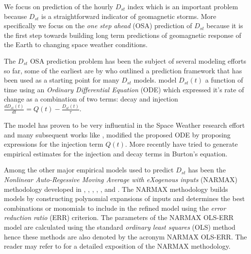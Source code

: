 \documentclass[referee,a4paper,12pt,traditabstract]{swsc}
\begin{document}
\begin{linenumbers}

We focus on prediction of the hourly $D_{st}$ index which is an important problem because $D_{st}$ is a straightforward indicator of geomagnetic storms. More specifically we focus on the \emph{one step ahead} (OSA) prediction of $D_{st}$ because it is the first step towards building long term predictions of geomagnetic response of the Earth to changing space weather conditions. 

The $D_{st}$ OSA prediction problem has been the subject of several modeling efforts so far, some of the earliest are by \citet{JGR:JGR10260} who outlined a prediction framework that has been used as a starting point for many $D_{st}$ models. \citet{JGR:JGR10260} model $D_{st}(t)$ a function of time using an \emph{Ordinary Differential Equation} (ODE) which expressed it's rate of change as a combination of two terms: decay and injection $\frac{d D_{st}(t)}{dt} = Q(t) - \frac{D_{st}(t)}{\tau}$. 

The \citet{JGR:JGR10260} model has proven to be very influential in the Space Weather research effort and many subsequent works like \citet{Wang:Dst}, \citet{JGRA:JGRA14856} modified the proposed ODE by proposing expressions for the injection term $Q(t)$. More recently \citet{Ballatore2014} have tried to generate empirical estimates for the injection and decay terms in Burton's equation.

Among the other major empirical models used to predict $D_{st}$ has been the \emph{Nonlinear Auto-Regessive Moving Average with eXogenous inputs} (NARMAX) methodology developed in \citet{doi:10.1080/00207178908559767}, \citet{GRL:GRL13494}, \citet{GRL:GRL20944}, \citet{JGRA:JGRA18657}, \citet{balikhin:narmax}, \citet{JGRA:JGRA20661} and \citet{JGRA:JGRA50192}. The NARMAX methodology builds models by constructing polynomial expansions of inputs and determines the best combinations or monomials to include in the refined model using the \emph{error reduction ratio} (ERR) criterion. The parameters of the NARMAX OLS-ERR model are calculated using the standard \emph{ordinary least squares} (OLS) method hence these methods are also denoted by the acronym NARMAX OLS-ERR. The reader may refer to \citet{billings2013nonlinear} for a detailed exposition of the NARMAX methodology.


\end{linenumbers}
\end{document}

